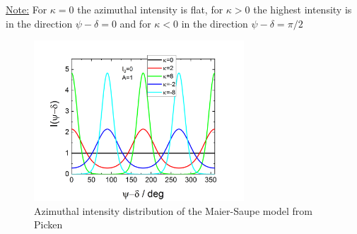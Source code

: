 \noindent \uline{Note:}
For $\kappa=0$ the azimuthal intensity is flat, for $\kappa>0$ the highest intensity is in the direction $\psi-\delta=0$ and for $\kappa<0$ in the direction $\psi-\delta=\pi/2$

\begin{figure}[htb]
\begin{center}
\includegraphics[width=0.7\textwidth]{../images/form_factor/azimuthal/maiersaupe.png}
\end{center}
\caption{Azimuthal intensity distribution of the Maier-Saupe model from Picken \cite{Picken1990}}
\label{fig:maiersaupe}
\end{figure}

\newpage
